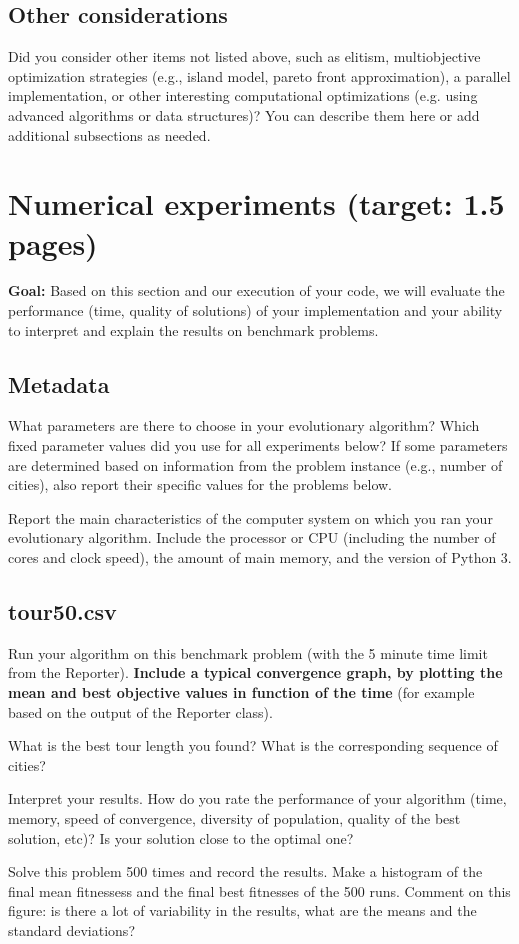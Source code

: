 \documentclass[a4paper,10pt]{article}
\newcommand{\ReplaceMe}[1]{{\color{blue}#1}}
\newcommand{\RemoveMe}[1]{{\color{purple}#1}}
\begin{document}
\subsection{Other considerations}\label{sec_oth}

\ReplaceMe{Did you consider other items not listed above, such as elitism, multiobjective optimization strategies (e.g., island model, pareto front approximation), a parallel implementation, or other interesting computational optimizations (e.g. using advanced algorithms or data structures)? You can describe them here or add additional subsections as needed.}


\section{Numerical experiments \hfill(target: 1.5 pages)}

\RemoveMe{\textbf{Goal:} Based on this section and our execution of your code, we will evaluate the performance (time, quality of solutions) of your implementation and your ability to interpret and explain the results on benchmark problems.}

\subsection{Metadata}

\ReplaceMe{What parameters are there to choose in your evolutionary algorithm? Which fixed parameter values did you use for all experiments below? If some parameters are determined based on information from the problem instance (e.g., number of cities), also report their specific values for the problems below.

Report the main characteristics of the computer system on which you ran your evolutionary algorithm. Include the processor or CPU (including the number of cores and clock speed), the amount of main memory, and the version of Python 3.}


\subsection{tour50.csv}

\ReplaceMe{Run your algorithm on this benchmark problem (with the 5 minute time limit from the Reporter). \textbf{Include a typical convergence graph, by plotting the mean and best objective values in function of the time} (for example based on the output of the Reporter class).

What is the best tour length you found? What is the corresponding sequence of cities? 

Interpret your results. How do you rate the performance of your algorithm (time, memory, speed of convergence, diversity of population, quality of the best solution, etc)? Is your solution close to the optimal one?

Solve this problem 500 times and record the results. Make a histogram of the final mean fitnessess and the final best fitnesses of the 500 runs. Comment on this figure: is there a lot of variability in the results, what are the means and the standard deviations?}
\end{document}
